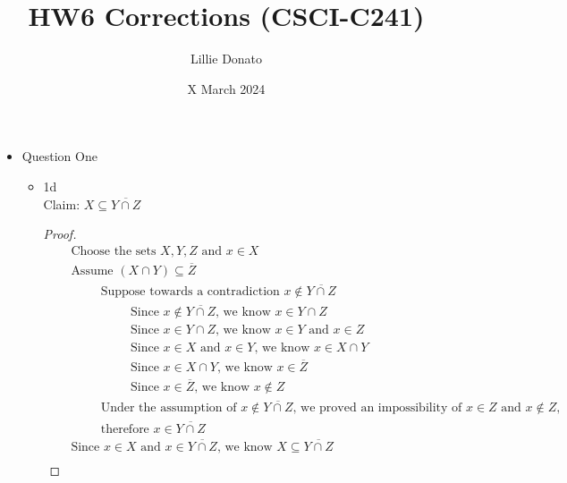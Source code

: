 \documentclass{article}
\title{HW6 Corrections (CSCI-C241)}
\author{Lillie Donato}
\date{X March 2024}
\begin{document}
\maketitle

\begin{itemize}
    \item Question One
    \begin{itemize}
        \item 1d \\
        Claim: $X \subseteq \overline{Y \cap Z}$
        \begin{proof}
            \begin{align}
                &\quad \text{Choose the sets } X, Y, Z \text{ and } x \in X \\
                &\quad \text{Assume } (X \cap Y) \subseteq \overline{Z} \\
                &\quad \hspace{1cm} \text{Suppose towards a contradiction } x \notin \overline{Y \cap Z} \\
                &\quad \hspace{2cm} \text{Since } x \notin \overline{Y \cap Z} \text{, we know } x \in Y \cap Z \\
                &\quad \hspace{2cm} \text{Since } x \in Y \cap Z \text{, we know } x \in Y \text{ and } x \in Z \\
                &\quad \hspace{2cm} \text{Since } x \in X \text{ and } x \in Y \text{, we know } x \in X \cap Y \\
                &\quad \hspace{2cm} \text{Since } x \in X \cap Y \text{, we know } x \in \overline{Z} \\
                &\quad \hspace{2cm} \text{Since } x \in \overline{Z} \text{, we know } x \notin Z \\
                &\quad \hspace{1cm} \text{Under the assumption of } x \notin \overline{Y \cap Z} \text{, we proved an impossibility of } x \in Z \text{ and } x \notin Z, \\
                &\quad \hspace{1cm} \text{therefore } x \in \overline{Y \cap Z} \nonumber \\
                &\quad \text{Since } x \in X \text{ and } x \in \overline{Y \cap Z} \text{, we know } X \subseteq \overline{Y \cap Z} \\

\end{align}
\end{proof}
\end{itemize}
\end{itemize}
\end{document}
